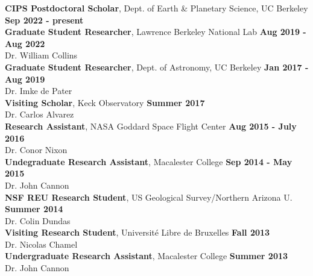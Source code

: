 \documentclass[margin, 10pt]{res} %
\newcommand\tab[1][1cm]{\hspace*{#1}}
\begin{document}
\begin{resume}
{\bf CIPS Postdoctoral Scholar}, Dept. of Earth \& Planetary Science, UC Berkeley \hfill {\bf
  Sep 2022 - present} \\
{\bf Graduate Student Researcher}, Lawrence Berkeley National Lab \hfill {\bf
  Aug 2019 - Aug 2022} \\
 \tab {\it Adviser:} Dr. William Collins \\
{\bf Graduate Student Researcher}, Dept. of Astronomy, UC Berkeley \hfill {\bf
  Jan 2017 - Aug 2019} \\
\tab {\it Adviser:} Dr. Imke de Pater \\
{\bf Visiting Scholar}, Keck Observatory \hfill {\bf
  Summer 2017} \\
\tab {\it Adviser:} Dr. Carlos Alvarez \\
{\bf Research Assistant}, NASA Goddard Space Flight Center \hfill {\bf
  Aug 2015 - July 2016} \\
\tab {\it Adviser:} Dr. Conor Nixon \\
{\bf Undegraduate Research Assistant}, Macalester College \hfill {\bf Sep
2014 - May 2015} \\
\tab {\it Adviser:} Dr. John Cannon \\
{\bf NSF REU Research Student}, US Geological Survey/Northern Arizona U. \hfill {\bf Summer 2014} \\
\tab {\it Adviser:} Dr. Colin Dundas \\
{\bf Visiting Research Student}, Universit\'e Libre de Bruxelles
\hfill {\bf Fall 2013} \\
\tab {\it Adviser:} Dr. Nicolas Chamel \\
{\bf Undergraduate Research Assistant}, Macalester College \hfill
{\bf Summer 2013} \\
\tab {\it Adviser:} Dr. John Cannon \\




\end{resume}
\end{document}
